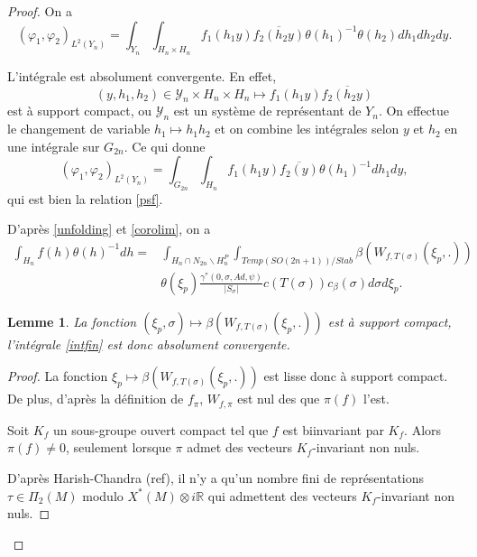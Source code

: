 \documentclass{amsart}
\newtheorem{lemme}{Lemme}[section]
\begin{document}
\begin{proof}
On a
\begin{equation}
(\varphi_1, \varphi_2)_{L^2(Y_n)} = \int_{Y_n} \int_{H_n \times H_n} f_1(h_1 y) \overline{f_2(h_2 y)} \theta(h_1)^{-1} \theta(h_2) dh_1 dh_2 dy.
\end{equation}

L'intégrale est absolument convergente. En effet,
\begin{equation}
(y,h_1,h_2) \in \mathcal{Y}_n \times H_n \times H_n \mapsto f_1(h_1 y) \overline{f_2(h_2 y)}
\end{equation}
est à support compact, ou $\mathcal{Y}_n$ est un système de représentant de $Y_n$.
On effectue le changement de variable $h_1 \mapsto h_1h_2$ et on combine les intégrales selon $y$ et $h_2$ en une intégrale sur $G_{2n}$. Ce qui donne
\begin{equation}
(\varphi_1, \varphi_2)_{L^2(Y_n)} = \int_{G_{2n}} \int_{H_n} f_1(h_1 y) \overline{f_2(y)} \theta(h_1)^{-1} dh_1 dy,
\end{equation}
qui est bien la relation \ref{psf}.

D'après \ref{unfolding} et \ref{corolim}, on a
\begin{equation}
\label{intfin}
\begin{split}
\int_{H_n} f(h) \theta(h)^{-1} dh = &\int_{H_n \cap N_{2n} \backslash H^P_n} \int_{Temp(SO(2n+1))/Stab} \beta\left(W_{f,T(\sigma)}(\xi_p,.)\right) \\
& \theta(\xi_p) \frac{\gamma^*(0, \sigma, Ad, \psi)}{|S_\sigma|}c(T(\sigma))c_\beta(\sigma) d\sigma d\xi_p.
\end{split}
\end{equation}

\begin{lemme}
La fonction $(\xi_p, \sigma) \mapsto \beta\left(W_{f,T(\sigma)}(\xi_p,.)\right)$ est à support compact, l'intégrale \ref{intfin} est donc absolument convergente.
\end{lemme}

\begin{proof}
La fonction $\xi_p \mapsto \beta\left(W_{f,T(\sigma)}(\xi_p,.)\right)$ est lisse donc à support compact. De plus, d'après la définition de $f_\pi$, $W_{f,\pi}$ est nul des que $\pi(f)$ l'est.

Soit $K_f$ un sous-groupe ouvert compact tel que $f$ est biinvariant par $K_f$. Alors $\pi(f) \neq 0$, seulement lorsque $\pi$ admet des vecteurs $K_f$-invariant non nuls.

D'après Harish-Chandra (ref), il n'y a qu'un nombre fini de représentations $\tau \in \Pi_2(M)$ modulo $X^*(M) \otimes i\mathbb{R}$ qui admettent des vecteurs $K_f$-invariant non nuls.


\end{proof}
\end{proof}
\end{document}
